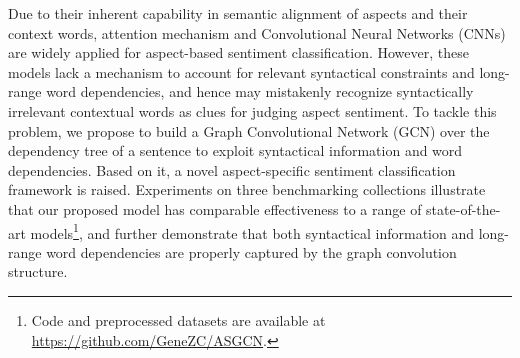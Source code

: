 Due to their inherent capability in semantic alignment of aspects and their context words, attention mechanism and Convolutional Neural Networks (CNNs) are widely applied for aspect-based sentiment classification. However, these models lack a mechanism to account for relevant syntactical constraints and long-range word dependencies, and hence may mistakenly recognize syntactically irrelevant contextual words as clues for judging aspect sentiment. To tackle this problem, we propose to build a Graph Convolutional Network (GCN) over the dependency tree of a sentence to exploit syntactical information and word dependencies. Based on it, a novel aspect-specific sentiment classification framework is raised. Experiments on three benchmarking collections illustrate that our proposed model has comparable effectiveness to a range of state-of-the-art models\footnote{Code and preprocessed datasets are available at \href{https://github.com/GeneZC/ASGCN}{https://github.com/GeneZC/ASGCN}.}, and further demonstrate that both syntactical information and long-range word dependencies are properly captured by the graph convolution structure.